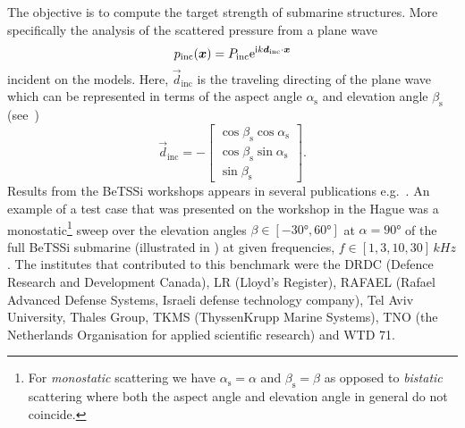 The objective is to compute the target strength of submarine structures. More specifically the analysis of the scattered pressure from a plane wave
\begin{equation}\label{Eq:p_inc}
	p_{\mathrm{inc}}(\vec{x}) = P_{\mathrm{inc}}\euler^{\imag k\vec{d}_{\mathrm{inc}}\cdot\vec{x}}
\end{equation}
incident on the models. Here, $\vec{d}_{\mathrm{inc}}$ is the traveling directing of the plane wave which can be represented in terms of the aspect angle $\alpha_{\mathrm{s}}$ and elevation angle $\beta_{\mathrm{s}}$ (see~)
\begin{equation*}
	\vec{d}_{\mathrm{inc}} = -\begin{bmatrix}
		\cos\beta_{\mathrm{s}}\cos\alpha_{\mathrm{s}}\\
		\cos\beta_{\mathrm{s}}\sin\alpha_{\mathrm{s}}\\
		\sin\beta_{\mathrm{s}}
	\end{bmatrix}.
\end{equation*}
Results from the BeTSSi workshops appears in several publications e.g.~\cite{Schneider2003asb,Nolte2015nmi,Burgschweiger2014rot,Fillinger2014aen,Nijhof2017bis}.
An example of a test case that was presented on the workshop in the Hague was a monostatic\footnote{For \textit{monostatic} scattering we have $\alpha_{\mathrm{s}}=\alpha$ and $\beta_{\mathrm{s}}=\beta$ as opposed to \textit{bistatic} scattering where both the aspect angle and elevation angle in general do not coincide.} sweep over the elevation angles $\beta\in[-\ang{30},\ang{60}]$ at $\alpha=\ang{90}$ of the full BeTSSi submarine (illustrated in ) at given frequencies, $f\in[1,3,10,30]\,\si{kHz}$. The institutes that contributed to this benchmark were the DRDC (Defence Research and Development Canada), LR (Lloyd's Register), RAFAEL (Rafael Advanced Defense Systems, Israeli defense technology company), Tel Aviv University, Thales Group, TKMS (ThyssenKrupp Marine Systems), TNO (the Netherlands Organisation for applied scientific research) and WTD 71.
